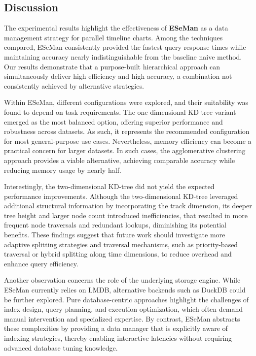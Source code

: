 \begin{refsection}
\section{Discussion}
\label{sec:discussion}

The experimental results highlight the effectiveness of \textbf{ESeMan} as a data management strategy for parallel timeline charts. Among the techniques compared, ESeMan consistently provided the fastest query response times while maintaining accuracy nearly indistinguishable from the baseline naive method. Our results demonstrate that a purpose-built hierarchical approach can simultaneously deliver high efficiency and high accuracy, a combination not consistently achieved by alternative strategies.  

Within ESeMan, different configurations were explored, and their suitability was found to depend on task requirements. The one-dimensional KD-tree variant emerged as the most balanced option, offering superior performance and robustness across datasets. As such, it represents the recommended configuration for most general-purpose use cases. Nevertheless, memory efficiency can become a practical concern for larger datasets. In such cases, the agglomerative clustering approach provides a viable alternative, achieving comparable accuracy while reducing memory usage by nearly half.  

Interestingly, the two-dimensional KD-tree did not yield the expected performance improvements. Although the two-dimensional KD-tree leveraged additional structural information by incorporating the track dimension, its deeper tree height and larger node count introduced inefficiencies, that resulted in more frequent node traversals and redundant lookups, diminishing its potential benefits. These findings suggest that future work should investigate more adaptive splitting strategies and traversal mechanisms, such as priority-based traversal or hybrid splitting along time dimensions, to reduce overhead and enhance query efficiency.  

Another observation concerns the role of the underlying storage engine. While ESeMan currently relies on LMDB, alternative backends such as DuckDB could be further explored. Pure database-centric approaches highlight the challenges of index design, query planning, and execution optimization, which often demand manual intervention and specialized expertise. By contrast, ESeMan abstracts these complexities by providing a data manager that is explicitly aware of indexing strategies, thereby enabling interactive latencies without requiring advanced database tuning knowledge.  


\end{refsection}
